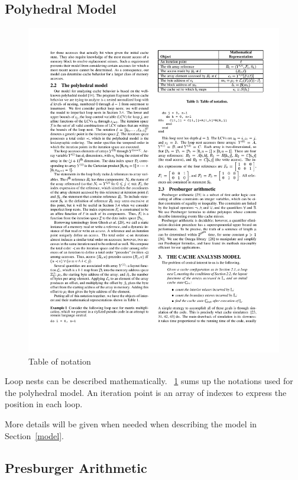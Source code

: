 \documentclass{article}
\begin{document}
\subsection{Polyhedral Model}
\begin{figure}
        \centering
        \includegraphics[trim={0 0.6cm 0 0}, clip, scale=1.1]{table1}
        \caption{Table of notation}
\label{fig:table1}
\end{figure}

Loop nests can be described mathematically.
\figurename~\ref{fig:table1} sums up the notations used for the polyhedral model.
An iteration point is an array of indexes to express the position in each loop.

More details will be given when needed when describing the model in Section~\ref{model}.

\subsection{Presburger Arithmetic}
\end{document}
